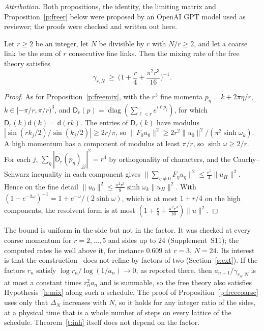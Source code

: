 \emph{Attribution.} Both propositions, the identity, the limiting matrix and Proposition~\ref{p:freer} below
were proposed by an OpenAI GPT model used as reviewer; the proofs were checked and written out here.

\begin{proposition}\label{p:freer}
Let $r\ge2$ be an integer, let $N$ be divisible by $r$ with $N/r\ge2$, and let a coarse link be the sum of
$r$ consecutive fine links. Then the mixing rate of the free theory satisfies
\[
\gamma_{r,N}\ \ge\ \Big(1+\frac r4+\frac{\pi^2r^3}{16}\Big)^{-1}.
\]
\end{proposition}
\begin{proof}
As for Proposition~\ref{p:freemix}, with the $r^3$ fine momenta $p_\eta=k+2\pi\eta/r$, $k\in[-\pi/r,\pi/r)^3$,
and $\mathsf D_r(p)=\operatorname{diag}(\sum_{\ell<r}e^{i\ell p_j})$, for which
$\mathsf D_r(k)\mathsf d(k)=\mathsf d(rk)$. The entries of $\mathsf D_r(k)$ have modulus
$|\sin(rk_j/2)/\sin(k_j/2)|\ge2r/\pi$, so $\|F_0u_0\|^2\ge2r^2\|u_0\|^2/(\pi^2\sinh\omega_k)$. A high
momentum has a component of modulus at least $\pi/r$, so $\sinh\omega\ge2/r$. For each $j$,
$\sum_\eta|\mathsf D_r(p_\eta)_{jj}|^2=r^4$ by orthogonality of characters, and the Cauchy--Schwarz inequality
in each component gives $\|\sum_{\eta\ne0}F_\eta u_\eta\|^2\le\tfrac{r^5}4\|u_H\|^2$. Hence on the fine detail
$\|u_0\|^2\le\tfrac{\pi^2r^3}8\sinh\omega_k\|u_H\|^2$. With $(1-e^{-2\omega})^{-1}=1+e^{-\omega}/(2\sinh\omega)$,
which is at most $1+r/4$ on the high components, the resolvent form is at most
$(1+\tfrac r4+\tfrac{\pi^2r^3}{16})\|u\|^2$.
\end{proof}

The bound is uniform in the side but not in the factor. It was checked at every coarse momentum for
$r=2,\dots,5$ and sides up to $24$ (Supplement~S11); the computed rates lie well above it, for instance
$0.609$ at $r=3$, $N=24$. Its interest is that the construction~\cite{OAI} does not refine by factors of
two (Section~\ref{s:ext}). If the factors $r_n$ satisfy $\log r_n/\log(1/a_n)\to0$, as reported there, then
$a_{n+1}/\gamma_{r_n,N}$ is at most a constant times $r_n^2a_n$ and is summable, so the free theory also satisfies
Hypothesis~\ref{h:mix} along such a schedule. The proof of Proposition~\ref{p:freecoarse} uses only that
$\Delta_N$ increases with $N$, so it holds for any integer ratio of the sides, at a physical time that is a
whole number of steps on every lattice of the schedule. Theorem~\ref{t:inh} itself does not depend on the factor.

